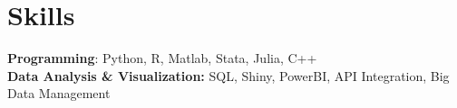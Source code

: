\section{Skills}
\textbf{Programming}: Python, R, Matlab, Stata, Julia, C++\\ %
\textbf{Data Analysis \& Visualization:} SQL, Shiny, PowerBI, API Integration, Big Data Management



